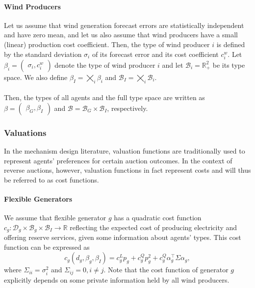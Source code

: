 \documentclass{article}
\begin{document}
\paragraph{Wind Producers} Let us assume that wind generation forecast errors are statistically independent and have zero mean, and let us also assume that wind producers have a small (linear) production cost coefficient. Then, the type of wind producer $i$ is defined by the standard deviation $\sigma_i$ of its forecast error and its cost coefficient $c_i^w$. Let $\beta_i = \begin{pmatrix}\sigma_i, c_i^w\end{pmatrix}$ denote the type of wind producer $i$ and let $\mathcal{B}_i = \mathbb{R}_+^2$ be its type space. We also define $\beta_I = \bigtimes_i \beta_i$ and $\mathcal{B}_I = \bigtimes_i \mathcal{B}_i$.

\paragraph{} Then, the types of all agents and the full type space are written as $\beta = \begin{pmatrix}\beta_G, \beta_I\end{pmatrix}$ and $\mathcal{B} = \mathcal{B}_G \times \mathcal{B}_I$, respectively.

\subsubsection{Valuations}

In the mechanism design literature, valuation functions are traditionally used to represent agents' preferences for certain auction outcomes. In the context of reverse auctions, however, valuation functions in fact represent costs and will thus be referred to as cost functions. 

\paragraph{Flexible Generators} We assume that flexible generator $g$ has a quadratic cost function $c_g: \mathcal{D}_g \times \mathcal{B}_g \times \mathcal{B}_I \rightarrow \mathbb{R}$ reflecting the expected cost of producing electricity and offering reserve services, given some information about agents' types. This cost function can be expressed as
\begin{equation*}
c_g(d_g, \beta_g, \beta_I) = c_g^L p_g + c_g^Q p_g^2 + c_g^Q \alpha_g^\top \Sigma \alpha_g,
\end{equation*}
where $\Sigma_{ii} = \sigma_i^2$ and $\Sigma_{ij} = 0, i \ne j$. Note that the cost function of generator $g$ explicitly depends on some private information held by all wind producers.
\end{document}
